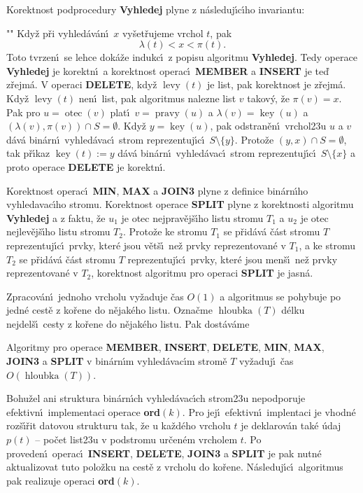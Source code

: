 \documentclass[a4paper,12pt]{article}
\DeclareMathOperator*{\otec}{otec}
\DeclareMathOperator*{\levy}{levy}
\DeclareMathOperator*{\pravy}{pravy}
\DeclareMathOperator*{\key}{key}
\DeclareMathOperator*{\hloubka}{hloubka}
\begin{document}
\flushpar Korektnost podprocedury {\bf Vyhledej} plyne z 
n\'asleduj\'\i c\'\i ho invariantu:
\roster
\item"{}"
Kdy\v z p\v ri vyhled\'av\'an\'\i\ $x$ vy\v set\v rujeme vrchol $
t$, pak 
$$\lambda (t)<x<\pi (t).$$
\endroster
Toto tvrzen\'\i\ se lehce dok\'a\v ze indukc\'\i\ z popisu algoritmu 
{\bf Vy\-hledej}.  Tedy operace {\bf Vy\-hledej} je korektn\'\i\ a korekt\-nost 
ope\-rac\'\i\ {\bf MEMBER} a {\bf INSERT} je te\v d z\v rejm\'a. V operaci {\bf DELE\-TE},  
kdy\v z $\levy(t)$ je list, pak korektnost je z\v rejm\'a. Kdy\v z $\levy
(t)$ 
nen\'\i\ list, pak algoritmus nalezne list $v$ takov\'y, \v ze $\pi(v)=x$. 
Pak pro $u=\otec(v)$ plat\'\i\ $v=\pravy(u)$ a $\lambda(v)=\key(u)$ a 
$(\lambda(v),\pi(v))\cap S=\emptyset$. Kdy\v z $y=\key(u)$, pak 
odstran\v en\'\i\ vrchol\accent23u $u$ a $v$ d\'av\'a bin\'arn\'\i\ vyhled\'avac\'\i\ strom reprezentuj\'\i c\'\i\ $S\setminus \{y\}$. 
Proto\v ze $(y,x)\cap S=\emptyset$, tak p\v r\'\i kaz $\key(t):=y$ d\'av\'a bin\'arn\'\i\ 
vyhled\'avac\'\i\ strom reprezentuj\'\i c\'\i\ $S\setminus \{x\}$ a proto operace 
{\bf DELETE} je korektn\'\i . 
\medskip

\flushpar Korektnost operac\'\i\ {\bf MIN}, {\bf MAX} a {\bf JOIN3} plyne z definice 
bin\'arn\'\i ho vyhledavac\'\i ho stromu.  Korektnost operace {\bf SPLIT }
plyne z korektnosti algoritmu {\bf Vyhledej} a z faktu, \v ze $u_
1$ je otec 
nej\-prav\v ej\v s\'\i ho listu stromu $T_1$ a $u_2$ je otec nejlev\v ej\v s\'\i ho listu stromu $T_2$.  
Proto\v ze ke stromu $T_1$ se p\v rid\'av\'a \v c\'ast stromu $T$ reprezentuj\'\i c\'\i\ 
prvky, kter\'e jsou v\v et\v s\'\i\ ne\v z prvky reprezentovan\'e v $
T_1$, a ke 
stromu $T_2$ se p\v rid\'av\'a \v c\'ast stromu $T$ reprezentuj\'\i c\'\i\ prvky, 
kter\'e jsou men\v s\'\i\ ne\v z prvky reprezentovan\'e v $T_2$, korektnost 
algoritmu pro operaci {\bf SPLIT} je jasn\'a.  
\medskip

\flushpar Zpracov\'an\'\i\ jednoho vrcholu vy\v zaduje \v cas $O(
1)$ a 
algoritmus se pohybuje po jedn\'e cest\v e z ko\v rene do 
n\v ejak\'eho listu. Ozna\v cme $\hloubka(T)$ d\'elku nejdel\v s\'\i\ cesty 
z ko\v rene do n\v ejak\'eho listu. Pak dost\'av\'ame
\medskip

Algoritmy pro operace {\bf MEMBER}, {\bf INSERT}, {\bf DE\-LE\-TE}, {\bf MIN}, {\bf MAX}, 
{\bf JOIN3} a {\bf SPLIT} v bin\'ar\-n\'\i m vy\-hled\'a\-va\-c\'\i m stro\-m\v e $
T$ vy\v zaduj\'\i\ 
\v cas $O(\hloubka(T))$. 
\endproclaim

\flushpar Bohu\v zel ani struktura bin\'arn\'\i ch vyhled\'avac\'\i ch 
strom\accent23u nepodporuje efektivn\'\i\ implementaci operace 
{\bf ord$(k)$}. Pro jej\'\i\ efektivn\'\i\ implentaci je vhodn\'e roz\v s\'\i\v rit 
datovou strukturu tak, \v ze u ka\v zd\'eho vrcholu $t$ je deklarov\'an 
tak\'e \'udaj $p(t)$ -- po\v cet list\accent23u v podstromu ur\v cen\'em 
vrcholem $t$. Po proveden\'\i\ operac\'\i\ {\bf INSERT}, {\bf DELETE}, {\bf JOIN3} a 
{\bf SPLIT} je pak nutn\'e aktualizovat tuto polo\v zku na cest\v e z 
vrcholu do ko\v rene. N\'asleduj\'\i c\'\i\ algoritmus pak 
realizuje operaci {\bf ord}$(k)$.
\medskip
\end{document}
